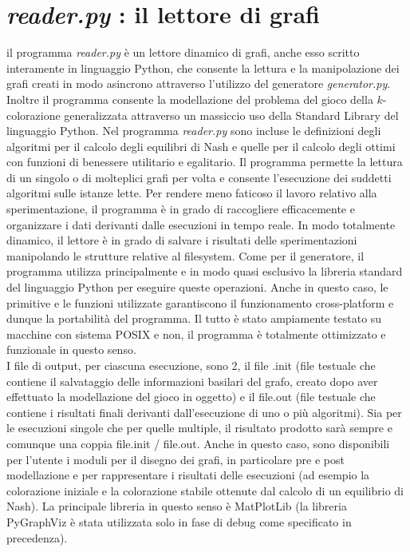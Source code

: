 \section{\textit{reader.py} : il lettore di grafi}
\justify
il programma \textit{reader.py} è un lettore dinamico di grafi, anche esso scritto interamente in linguaggio Python, che consente la lettura e la manipolazione dei grafi creati in modo asincrono attraverso l'utilizzo del generatore \textit{generator.py}. Inoltre il programma consente la modellazione del problema del gioco della \(k\)-colorazione generalizzata attraverso un massiccio uso della Standard Library del linguaggio Python. Nel programma \textit{reader.py} sono incluse le definizioni degli algoritmi per il calcolo degli equilibri di Nash e quelle per il calcolo degli ottimi con funzioni di benessere utilitario e egalitario. Il programma permette la lettura di un singolo o di molteplici grafi per volta e consente l'esecuzione dei suddetti algoritmi sulle istanze lette. Per rendere meno faticoso il lavoro relativo alla sperimentazione, il programma è in grado di raccogliere efficacemente e organizzare i dati derivanti dalle esecuzioni in tempo reale. In modo totalmente dinamico, il lettore è in grado di salvare i risultati delle sperimentazioni manipolando le strutture relative al filesystem. Come per il generatore, il programma utilizza principalmente e in modo quasi esclusivo la libreria standard del linguaggio Python per eseguire queste operazioni. Anche in questo caso, le primitive e le funzioni utilizzate garantiscono il funzionamento cross-platform e dunque la portabilità del programma. Il tutto è stato ampiamente testato su macchine con sistema POSIX e non, il programma è totalmente ottimizzato e funzionale in questo senso.\\
I file di output, per ciascuna esecuzione, sono 2, il file .init (file testuale che contiene il salvataggio delle informazioni basilari del grafo, creato dopo aver effettuato la modellazione del gioco in oggetto) e il file.out (file testuale che contiene i risultati finali derivanti dall'esecuzione di uno o più algoritmi). Sia per le esecuzioni singole che per quelle multiple, il risultato prodotto sarà sempre e comunque una coppia file.init / file.out. Anche in questo caso, sono disponibili per l'utente i moduli per il disegno dei grafi, in particolare pre e post modellazione e per rappresentare i risultati delle esecuzioni (ad esempio la colorazione iniziale e la colorazione stabile ottenute dal calcolo di un equilibrio di Nash). La principale libreria in questo senso è MatPlotLib (la libreria PyGraphViz è stata utilizzata solo in fase di debug come specificato in precedenza).\\
